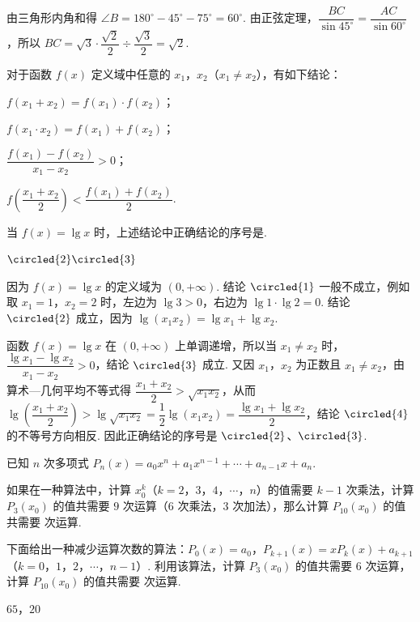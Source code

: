 \begin{solution}
由三角形内角和得 \(\angle B=180^{\circ}-45^{\circ}-75^{\circ}=60^{\circ}\). 由正弦定理，\(\dfrac{BC}{\sin45^{\circ}}=\dfrac{AC}{\sin60^{\circ}}\)，所以 \(BC=\sqrt3\cdot\dfrac{\sqrt2}{2}\div\dfrac{\sqrt3}{2}=\sqrt2\).
\end{solution}

\begin{problem}
对于函数 \(f(x)\) 定义域中任意的 \(x_1\)，\(x_2\)（\(x_1\neq x_2\)），有如下结论：

\begin{circlelist}
\item \(f(x_1+x_2)=f(x_1)\cdot f(x_2)\)；
\item \(f(x_1\cdot x_2)=f(x_1)+f(x_2)\)；
\item \(\dfrac{f(x_1)-f(x_2)}{x_1-x_2}>0\)；
\item \(f\left(\dfrac{x_1+x_2}{2}\right)<\dfrac{f(x_1)+f(x_2)}{2}\).
\end{circlelist}

当 \(f(x)=\lg x\) 时，上述结论中正确结论的序号是\fillinblank{}.
\begin{answer}
\(\circled{2}\circled{3}\)
\end{answer}
\end{problem}

\begin{solution}
因为 \(f(x)=\lg x\) 的定义域为 \((0,+\infty)\). 结论 \(\circled{1}\) 一般不成立，例如取 \(x_1=1\)，\(x_2=2\) 时，左边为 \(\lg3>0\)，右边为 \(\lg1\cdot\lg2=0\). 结论 \(\circled{2}\) 成立，因为 \(\lg(x_1x_2)=\lg x_1+\lg x_2\).

函数 \(f(x)=\lg x\) 在 \((0,+\infty)\) 上单调递增，所以当 \(x_1\neq x_2\) 时，\(\dfrac{\lg x_1-\lg x_2}{x_1-x_2}>0\)，结论 \(\circled{3}\) 成立. 又因 \(x_1\)，\(x_2\) 为正数且 \(x_1\neq x_2\)，由算术—几何平均不等式得 \(\dfrac{x_1+x_2}{2}>\sqrt{x_1x_2}\)，从而 \(\lg\left(\dfrac{x_1+x_2}{2}\right)>\lg\sqrt{x_1x_2}=\dfrac{1}{2}\lg(x_1x_2)=\dfrac{\lg x_1+\lg x_2}{2}\)，结论 \(\circled{4}\) 的不等号方向相反. 因此正确结论的序号是 \(\circled{2}\)、\(\circled{3}\).
\end{solution}

\begin{problem}
已知 \(n\) 次多项式 \(P_n(x)=a_0x^n+a_1x^{n-1}+\cdots+a_{n-1}x+a_n\).

如果在一种算法中，计算 \(x_0^k\)（\(k=2\)，\(3\)，\(4\)，\(\cdots\)，\(n\)）的值需要 \(k-1\) 次乘法，计算 \(P_3(x_0)\) 的值共需要 \(9\) 次运算（\(6\) 次乘法，\(3\) 次加法），那么计算 \(P_{10}(x_0)\) 的值共需要\fillinblank{} 次运算.

下面给出一种减少运算次数的算法：\(P_0(x)=a_0\)，\(P_{k+1}(x)=xP_k(x)+a_{k+1}\)（\(k=0\)，\(1\)，\(2\)，\(\cdots\)，\(n-1\)）. 利用该算法，计算 \(P_3(x_0)\) 的值共需要 \(6\) 次运算，计算 \(P_{10}(x_0)\) 的值共需要\fillinblank{} 次运算.
\begin{answer}
\(65\)，\(20\)
\end{answer}
\end{problem}

